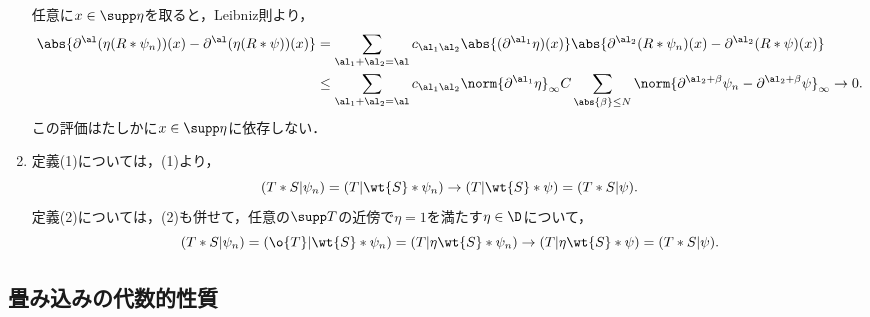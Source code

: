 \documentclass[uplatex,dvipdfmx]{jsreport}
\begin{document}
\begin{Proof}
\begin{enumerate}
        任意に$x\in\supp\eta$を取ると，Leibniz則より，
        \begin{align*}
            \abs{\partial^\al(\eta(R*\psi_n))(x)-\partial^\al(\eta(R*\psi))(x)}&=\sum_{\al_1+\al_2=\al}c_{\al_1\al_2}\abs{(\partial^{\al_1}\eta)(x)}\abs{\partial^{\al_2}(R*\psi_n)(x)-\partial^{\al_2}(R*\psi)(x)}\\
            &\le\sum_{\al_1+\al_2=\al}c_{\al_1\al_2}\norm{\partial^{\al_1}\eta}_\infty C\sum_{\abs{\beta}\le N}\norm{\partial^{\al_2+\beta}\psi_n-\partial^{\al_2+\beta}\psi}_\infty\to0.
        \end{align*}
        この評価はたしかに$x\in\supp\eta$に依存しない．
        \item 定義(1)については，(1)より，
        \[(T*S|\psi_n)=(T|\wt{S}*\psi_n)\to(T|\wt{S}*\psi)=(T*S|\psi).\]
        定義(2)については，(2)も併せて，任意の$\supp T$の近傍で$\eta=1$を満たす$\eta\in\D$について，
        \[(T*S|\psi_n)=(\o{T}|\wt{S}*\psi_n)=(T|\eta\wt{S}*\psi_n)\to(T|\eta\wt{S}*\psi)=(T*S|\psi).\]
    \end{enumerate}
\end{Proof}

\subsection{畳み込みの代数的性質}
\end{document}
